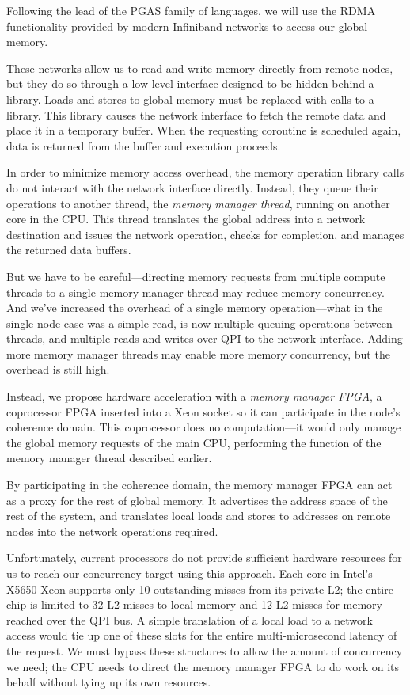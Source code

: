 \documentclass{acm_proc_article-sp}
\begin{document}
Following the lead of the PGAS family of languages, we will use
the RDMA functionality provided by modern Infiniband networks to
access our global memory. 

These networks allow us to read and write memory directly from remote
nodes, but they do so through a low-level interface designed to be
hidden behind a library. Loads and stores to global memory must be
replaced with calls to a library. This library causes the network
interface to fetch the remote data and place it in a temporary
buffer. When the requesting coroutine is scheduled again, data is
returned from the buffer and execution proceeds.


In order to minimize memory access overhead, the memory operation
library calls do not interact with the network interface
directly. Instead, they queue their operations to another thread, the
{\em memory manager thread}, running on another core in the CPU. This thread
translates the global address into a network destination and issues
the network operation, checks for completion, and manages the returned
data buffers.

But we have to be careful---directing memory requests from multiple
compute threads to a single memory manager thread may reduce memory
concurrency. And we've increased the overhead of a single memory
operation---what in the single node case was a simple read, is now
multiple queuing operations between threads, and multiple reads and
writes over QPI to the network interface. Adding more memory manager
threads may enable more memory concurrency, but the overhead is still high.

Instead, we propose hardware acceleration with a {\em memory manager
  FPGA}, a coprocessor FPGA inserted into a Xeon socket so it can
participate in the node's coherence domain. This coprocessor does no
computation---it would only manage the global memory requests of the
main CPU, performing the function of the memory manager thread
described earlier.

By participating in the coherence domain, the memory manager FPGA can
act as a proxy for the rest of global memory. It advertises the
address space of the rest of the system, and translates local loads
and stores to addresses on remote nodes into the network operations
required.

Unfortunately, current processors do not provide sufficient hardware
resources for us to reach our concurrency target using this
approach. Each core in Intel's X5650 Xeon supports only 10 outstanding
misses from its private L2; the entire chip is limited to 32 L2 misses
to local memory and 12 L2 misses for memory reached over the QPI
bus. A simple translation of a local load to a network access would
tie up one of these slots for the entire multi-microsecond latency of
the request. We must bypass these structures to allow the amount of
concurrency we need; the CPU needs to direct the memory manager FPGA
to do work on its behalf without tying up its own resources.
\end{document}
